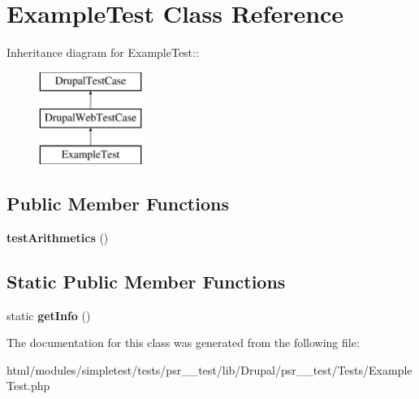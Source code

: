 \hypertarget{classExampleTest}{
\section{ExampleTest Class Reference}
\label{classExampleTest}
}
Inheritance diagram for ExampleTest::\begin{figure}[H]
\begin{center}
\leavevmode
\includegraphics[height=3cm]{classExampleTest}
\end{center}
\end{figure}
\subsection*{Public Member Functions}
\begin{DoxyCompactItemize}
\item 
\hypertarget{classExampleTest_a12e08b1cf68ec449a8cf471cbf8e154f}{
{\bfseries testArithmetics} ()}
\label{classExampleTest_a12e08b1cf68ec449a8cf471cbf8e154f}

\end{DoxyCompactItemize}
\subsection*{Static Public Member Functions}
\begin{DoxyCompactItemize}
\item 
\hypertarget{classExampleTest_a7324943c41c8688e26e7ccef64e318c2}{
static {\bfseries getInfo} ()}
\label{classExampleTest_a7324943c41c8688e26e7ccef64e318c2}

\end{DoxyCompactItemize}


The documentation for this class was generated from the following file:\begin{DoxyCompactItemize}
\item 
html/modules/simpletest/tests/psr\_\_\-test/lib/Drupal/psr\_\_\-test/Tests/ExampleTest.php\end{DoxyCompactItemize}
